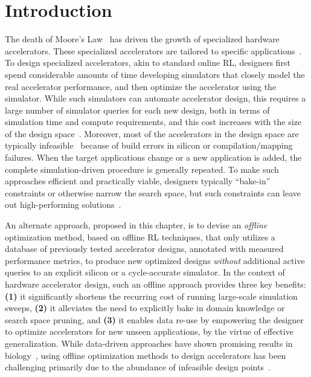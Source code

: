 \vspace{-0.2cm}
\section{Introduction}
\label{sec:prime_intro}
\vspace{-0.2cm}
The death of Moore's Law~\citep{esmaeilzadeh2011dark} has driven the growth of specialized hardware accelerators. These specialized accelerators are tailored to specific applications~\citep{yazdanbakhsh2021apollo,reagen2017case,prac_dse:mascots:2019,shi2020learned}. To design specialized accelerators, akin to standard online RL, designers first spend considerable amounts of time developing simulators that closely model the real accelerator performance, and then optimize the accelerator using the simulator. While such simulators can automate accelerator design, this requires a large number of simulator queries for each new design, both in terms of simulation time and compute requirements, and this cost increases with the size of the design space~\citep{yazdanbakhsh2021evaluation,shi2020learned,hegdemind}.
Moreover, most of the accelerators in the design space are typically infeasible~\citep{hegdemind,yazdanbakhsh2021apollo} because of build errors in silicon or compilation/mapping failures. 
When the target applications change or a new application is added, the complete simulation-driven procedure is generally repeated.
To make such approaches efficient and practically viable, designers typically ``bake-in'' constraints or otherwise narrow the search space, but such constraints can leave out high-performing solutions~\citep{dmazerunner,timeloop,marvel}.

An alternate approach, proposed in this chapter, is to devise an \textit{offline} optimization method, based on offline RL techniques, that only utilizes a database of previously tested accelerator designs, annotated with measured performance metrics, to produce new optimized designs \emph{without} additional active queries to an explicit silicon or a cycle-accurate simulator. In the context of hardware accelerator design, such an offline approach provides three key benefits: \textbf{(1)} it significantly shortens the recurring cost of running large-scale simulation sweeps, \textbf{(2)} it alleviates the need to explicitly bake in domain knowledge or search space pruning, and {\textbf{(3)} it enables data re-use by empowering the designer to optimize accelerators for new unseen applications, by the virtue of effective generalization.}
While data-driven approaches have shown promising results in biology~\citep{fu2021offline,brookes19a,trabucco2021conservative},
using offline optimization methods to design accelerators has been challenging primarily due to the abundance of infeasible design points~\citep{yazdanbakhsh2021apollo,hegdemind}.

